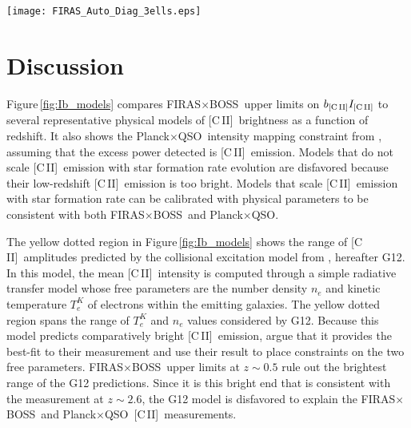 \documentclass[fleqn,usenatbib]{mnras}
\newcommand{\cii}{[C{\sc\,II}]}
\newcommand{\FF}{FIRAS${\times}$FIRAS}
\newcommand{\FB}{FIRAS${\times}$BOSS}
\newcommand{\PB}{Planck${\times}$QSO}
\begin{document}
\begin{figure*}
    \texttt{[image: FIRAS\_Auto\_Diag\_3ells.eps]}
    \caption{ \label{fig:FIRAS_auto_diag} The redshift diagonal of the \FF\ binned angular power spectrum, $C_b(z=z')$, for both the CMASS and LOWZ redshift regions. The three angular bins, centered at $\ell=24$, $\ell=33$, and $\ell=42$ are plotted in red, green, and blue, respectively. The best-fit models are plotted as solid lines, and the data are plotted as triangles or circles, with error bars computed from the best-fit model. The $\ell=24$ data are artificially shifted backward by half a redshift bin for visual clarity. Dashed lines show the thermal noise portion of the best-fit model only. From the dashed lines, the effect of the FIRAS beam and scan convolution can be seen, as the thermal noise increases from low to high $\ell$. Only the $\ell=24$ bin has a significant foreground contribution.}
\end{figure*}

\section{Discussion}\label{sec:Discussion}

Figure\,\ref{fig:Ib_models} compares \FB\ upper limits on $b_{\rm \cii}I_{\rm \cii}$ to several representative physical models of \cii\ brightness as a function of redshift. 
It also shows the \PB\ intensity mapping constraint from \cite{yang2019evidence}, assuming that the excess power detected is \cii\ emission.
Models that do not scale \cii\ emission with star formation rate evolution are disfavored because their low-redshift \cii\ emission is too bright. Models that scale \cii\ emission with star formation rate can be calibrated with physical parameters to be consistent with both \FB\ and \PB. 

The yellow dotted region in Figure\,\ref{fig:Ib_models} shows the range of \cii\ amplitudes predicted by the collisional excitation model from \citet{Gong2012}, hereafter G12.  In this model, the mean \cii\ intensity is computed through a simple radiative transfer model whose free parameters are the number density $n_e$ and kinetic temperature $T_e^K$ of electrons within the emitting galaxies.  The yellow dotted region spans the range of $T_e^K$ and $n_e$ values considered by G12.  Because this model predicts comparatively bright \cii\ emission, \citet{yang2019evidence} argue that it provides the best-fit to their measurement and use their result to place constraints on the two free parameters. \FB\ upper limits at $z {\sim} 0.5$ rule out the brightest range of the G12 predictions.  Since it is this bright end that is consistent with the \citet{yang2019evidence} measurement at $z\sim2.6$, the G12 model is disfavored to explain the \FB\ and \PB\ \cii\ measurements. 
\end{document}
